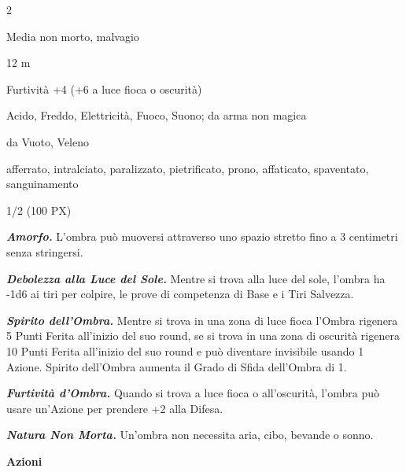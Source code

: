 \begin{multicols}{2}
{
\begin{description}[noitemsep, topsep=0pt, parsep=0pt, partopsep=0pt, itemsep=1pt, leftmargin=2.35cm,  labelwidth=2.2cm, itemindent=0cm, listparindent=0pt] %
\setlength{\baselineskip}{10pt}
\item[\textbf{Taglia/Tipo}] Media non morto, malvagio
\item[\textbf{Caratt.}] 
\item[\textbf{Punti Ferita}] 
\item[\textbf{Movimento}] 12 m
\item[\textbf{Tiri Salvez.}] 
\item[\textbf{Comp.}] Furtività +4 (+6 a luce fioca o oscurità)
\item[\textbf{Res. Danni}] Acido, Freddo, Elettricità, Fuoco, Suono; da arma non magica
\item[\textbf{Imm. Danni}] da Vuoto, Veleno
\item[\textbf{Immunità}] afferrato, intralciato, paralizzato, pietrificato, prono, affaticato, spaventato, sanguinamento
\item[\textbf{Sensi}] 
\item[\textbf{Sfida}] 1/2 (100 PX)
\end{description}
\smallskip

\emph{\textbf{Amorfo.}} L'ombra può muoversi attraverso uno spazio stretto fino a 3 centimetri senza stringersi.

\emph{\textbf{Debolezza alla Luce del Sole.}} Mentre si trova alla luce del sole, l'ombra ha -1d6 ai tiri per colpire, le prove di competenza di Base e i Tiri Salvezza.

\emph{\textbf{Spirito dell'Ombra.}} Mentre si trova in una zona di luce fioca l'Ombra rigenera 5 Punti Ferita all'inizio del suo round, se si trova in una zona di oscurità rigenera 10 Punti Ferita all'inizio del suo round e può diventare invisibile usando 1 Azione. Spirito dell'Ombra aumenta il Grado di Sfida dell'Ombra di 1.

\emph{\textbf{Furtività d'Ombra.}} Quando si trova a luce fioca o all'oscurità, l'ombra può usare un'Azione per prendere +2 alla Difesa.

\emph{\textbf{Natura Non Morta.}} Un'ombra non necessita aria, cibo, bevande o sonno.

\textbf{Azioni}

}
\end{multicols}
